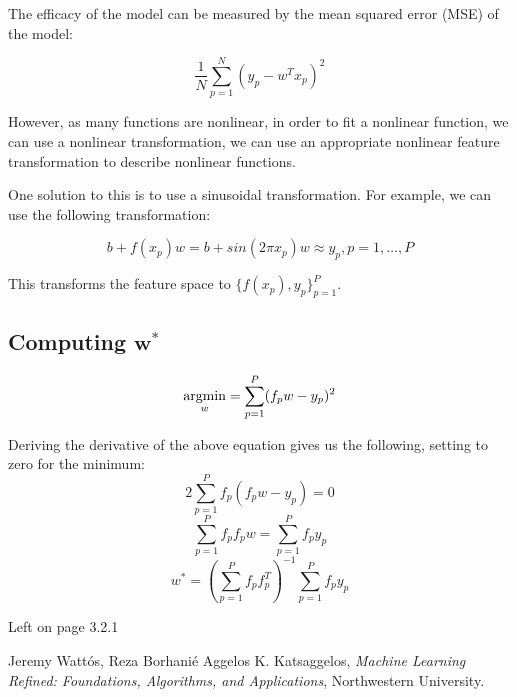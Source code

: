\documentclass[11pt]{article}
\begin{document}
The efficacy of the model can be measured by the mean squared error (MSE) of the model:



\begin{equation}
    \frac{1}{N} \sum_{p=1}^{N} (y_p - w^T x_p)^2
\end{equation}

However, as many functions are nonlinear, in order to fit a nonlinear function, we can use a nonlinear transformation, 
we can use an appropriate nonlinear feature transformation to describe nonlinear functions.



One solution to this is to use a sinusoidal transformation. For example, we can use the following transformation:

\begin{equation}
    b + f(x_p)w = b + sin(2 \pi x_p)w \approx y_p, p = 1, \ldots, P
\end{equation}

This transforms the feature space to $\{f(x_p), y_p\}^P_{p = 1}$.

\subsection {Computing $\textbf{w}^*$}

$$\operatorname*{argmin}_w = \sum_{p = 1}^{P}(f_pw - y_p)^2$$

Deriving the derivative of the above equation gives us the following, setting to zero for the minimum:
$$2 \sum_{p = 1}^{P}f_p(f_pw - y_p) = 0$$
$$\sum_{p = 1}^{P}f_pf_pw = \sum_{p = 1}^{P}f_py_p$$
$$w^* = \left(\sum_{p = 1}^{P}f_pf_p^T\right)^{-1}\sum_{p = 1}^{P}f_py_p$$


Left on page 3.2.1
%


\begin{thebibliography}{77}

Jeremy Watt\'{o}s, Reza Borhani\'{e} Aggelos K. Katsaggelos,
\emph{Machine Learning Refined: Foundations, Algorithms, and Applications},
Northwestern University.

\end{thebibliography}
\end{document}
